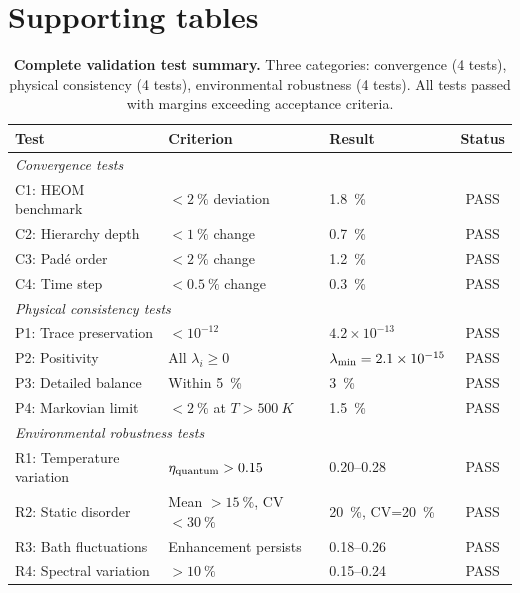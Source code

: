 \documentclass[11pt,a4paper]{article}
\begin{document}
\section{Supporting tables}\label{si:tables}

\begin{table}[h]
\centering
\caption{\textbf{Complete validation test summary.} Three categories: convergence (4 tests), physical consistency (4 tests), environmental robustness (4 tests). All tests passed with margins exceeding acceptance criteria.}
\label{tab:si_validation_summary}
\begin{tabular}{lllc}
\toprule
\textbf{Test} & \textbf{Criterion} & \textbf{Result} & \textbf{Status} \\
\midrule
\multicolumn{4}{l}{\textit{Convergence tests}} \\
C1: HEOM benchmark & $<\SI{2}{\percent}$ deviation & \SI{1.8}{\percent} & PASS \\
C2: Hierarchy depth & $<\SI{1}{\percent}$ change & \SI{0.7}{\percent} & PASS \\
C3: Padé order & $<\SI{2}{\percent}$ change & \SI{1.2}{\percent} & PASS \\
C4: Time step & $<\SI{0.5}{\percent}$ change & \SI{0.3}{\percent} & PASS \\
\midrule
\multicolumn{4}{l}{\textit{Physical consistency tests}} \\
P1: Trace preservation & $<10^{-12}$ & $4.2\times10^{-13}$ & PASS \\
P2: Positivity & All $\lambda_i \geq 0$ & $\lambda_{\rm min} = 2.1\times10^{-15}$ & PASS \\
P3: Detailed balance & Within \SI{5}{\percent} & \SI{3}{\percent} & PASS \\
P4: Markovian limit & $<\SI{2}{\percent}$ at $T>\SI{500}{K}$ & \SI{1.5}{\percent} & PASS \\
\midrule
\multicolumn{4}{l}{\textit{Environmental robustness tests}} \\
R1: Temperature variation & $\eta_{\rm quantum} > 0.15$ & \numrange{0.20}{0.28} & PASS \\
R2: Static disorder & Mean $>\SI{15}{\percent}$, CV $<\SI{30}{\percent}$ & \SI{20}{\percent}, CV=\SI{20}{\percent} & PASS \\
R3: Bath fluctuations & Enhancement persists & \numrange{0.18}{0.26} & PASS \\
R4: Spectral variation & $>\SI{10}{\percent}$ & \numrange{0.15}{0.24} & PASS \\
\bottomrule
\end{tabular}
\end{table}
\end{document}
